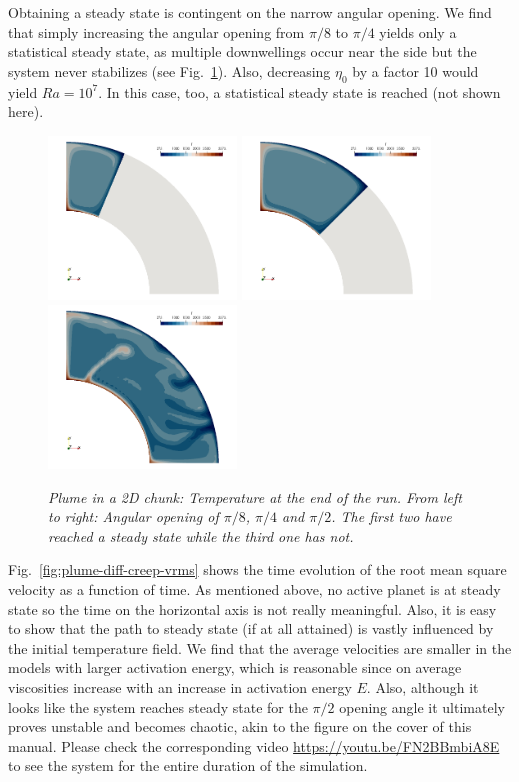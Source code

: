 Obtaining a steady state is contingent on the narrow angular opening. We find that simply increasing the angular opening from $\pi/8$ to $\pi/4$ yields only a statistical steady state, as multiple downwellings occur near the side but the system never stabilizes (see Fig.~\ref{fig:plume-angular-opening}). Also, decreasing $\eta_0$ by a factor 10 would yield $Ra=10^7$. In this case, too, a statistical steady state is reached (not shown here).

\begin{figure}
  \centering
  \includegraphics[width=5cm]{cookbooks/plume_2D_chunk/doc/exp1_22}
  \includegraphics[width=5cm]{cookbooks/plume_2D_chunk/doc/exp1_45}
  \includegraphics[width=5cm]{cookbooks/plume_2D_chunk/doc/exp1_90}
  \caption{\it Plume in a 2D chunk: Temperature at the end of the run. From left to right: Angular opening of
$\pi/8$, $\pi/4$ and $\pi/2$. The first two have reached a steady state while the third one has not.}
  \label{fig:plume-angular-opening}
\end{figure}

Fig.~\ref{fig:plume-diff-creep-vrms} shows the time evolution of the root mean square velocity as a function of time. 
As mentioned above, no active planet is at steady state so the time on the horizontal axis is not really meaningful. Also, it is easy to show that the path to steady state (if at all attained) is vastly influenced by the initial temperature field.
We find that the average velocities are smaller in the models with larger activation energy, which is reasonable since on average viscosities increase with an increase in activation energy $E$. Also, although it looks like the system reaches steady state for the $\pi/2$ opening angle it ultimately proves unstable and becomes chaotic, akin to the figure on the cover of this manual. Please check the corresponding video \url{https://youtu.be/FN2BBmbiA8E} to see the system for the entire duration of the simulation.

